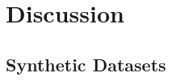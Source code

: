 \documentclass[../main.tex]{subfiles}
\begin{document}
    \chapter{Discussion}\label{ch:discussion}

    \section{Synthetic Datasets}\label{sec:synthetic-datasets}
\end{document}
